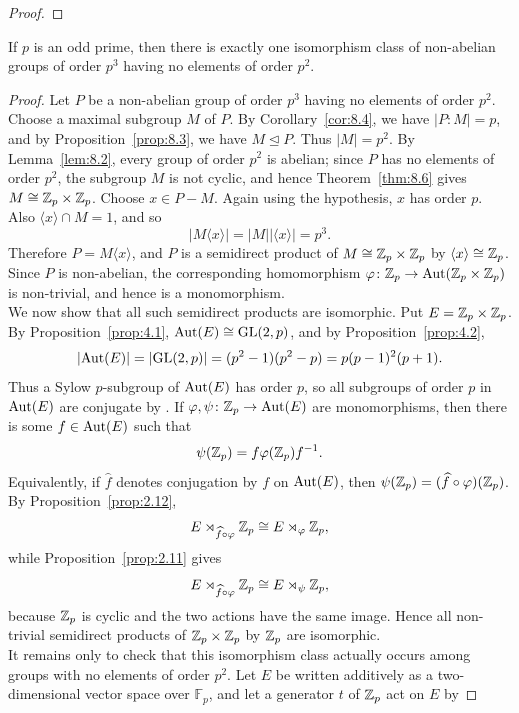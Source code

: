 \documentclass[../Odyssey_Project.tex]{subfiles}
\begin{document}
\begin{proof}
\end{proof}

\begin{proposition}
\label{prop:8.11}
If $p$ is an odd prime, then there is exactly one isomorphism class of non-abelian groups of order $p^3$ having no elements of order $p^2$.
\end{proposition}
\begin{proof}
Let $P$ be a non-abelian group of order $p^3$ having no elements of order $p^2$. Choose a maximal subgroup $M$ of $P$. By Corollary~\ref{cor:8.4}, we have $\lvert P:M\rvert=p$, and by Proposition~\ref{prop:8.3}, we have $M\trianglelefteq P$. Thus $\lvert M\rvert=p^2$. By Lemma~\ref{lem:8.2}, every group of order $p^2$ is abelian; since $P$ has no elements of order $p^2$, the subgroup $M$ is not cyclic, and hence Theorem~\ref{thm:8.6} gives $M\cong \mathbb{Z}_p\times \mathbb{Z}_p$. Choose $x\in P-M$. Again using the hypothesis, $x$ has order $p$. Also $\langle x\rangle\cap M=1$, and so
\[
    \lvert M\langle x\rangle\rvert
    =\lvert M\rvert\lvert\langle x\rangle\rvert
    =p^3.
\]
Therefore $P=M\langle x\rangle$, and $P$ is a semidirect product of $M\cong \mathbb{Z}_p\times\mathbb{Z}_p$ by $\langle x\rangle\cong \mathbb{Z}_p$. Since $P$ is non-abelian, the corresponding homomorphism $\varphi\colon \mathbb{Z}_p\to\operatorname{Aut}(\mathbb{Z}_p\times\mathbb{Z}_p)$ is non-trivial, and hence is a monomorphism.\\
We now show that all such semidirect products are isomorphic. Put $E=\mathbb{Z}_p\times\mathbb{Z}_p$. By Proposition~\ref{prop:4.1}, $\operatorname{Aut}(E)\cong \operatorname{GL}(2,p)$, and by Proposition~\ref{prop:4.2},
\[
    \lvert \operatorname{Aut}(E)\rvert
    =\lvert \operatorname{GL}(2,p)\rvert
    =(p^2-1)(p^2-p)
    =p(p-1)^2(p+1).
\]
Thus a Sylow $p$-subgroup of $\operatorname{Aut}(E)$ has order $p$, so all subgroups of order $p$ in $\operatorname{Aut}(E)$ are conjugate by . If $\varphi,\psi\colon \mathbb{Z}_p\to\operatorname{Aut}(E)$ are monomorphisms, then there is some $f\in\operatorname{Aut}(E)$ such that
\[
    \psi(\mathbb{Z}_p)=f\varphi(\mathbb{Z}_p)f^{-1}.
\]
Equivalently, if $\widehat f$ denotes conjugation by $f$ on $\operatorname{Aut}(E)$, then $\psi(\mathbb{Z}_p)=(\widehat f\circ\varphi)(\mathbb{Z}_p)$. By Proposition~\ref{prop:2.12},
\[
    E\rtimes_{\widehat f\circ\varphi}\mathbb{Z}_p\cong E\rtimes_{\varphi}\mathbb{Z}_p,
\]
while Proposition~\ref{prop:2.11} gives
\[
    E\rtimes_{\widehat f\circ\varphi}\mathbb{Z}_p\cong E\rtimes_{\psi}\mathbb{Z}_p,
\]
because $\mathbb{Z}_p$ is cyclic and the two actions have the same image. Hence all non-trivial semidirect products of $\mathbb{Z}_p\times\mathbb{Z}_p$ by $\mathbb{Z}_p$ are isomorphic.\\
It remains only to check that this isomorphism class actually occurs among groups with no elements of order $p^2$. Let $E$ be written additively as a two-dimensional vector space over $\mathbb{F}_p$, and let a generator $t$ of $\mathbb{Z}_p$ act on $E$ by

\end{proof}
\end{document}
